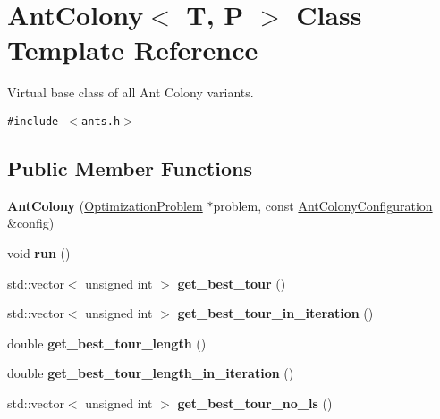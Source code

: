 \hypertarget{classAntColony}{
\section{AntColony$<$ T, P $>$ Class Template Reference}
\label{classAntColony}
}
Virtual base class of all Ant Colony variants.  


{\tt \#include $<$ants.h$>$}

\subsection*{Public Member Functions}
\begin{CompactItemize}
\item 
\hypertarget{classAntColony_68b01fbb4161e56af836d5d5fb99ea1e}{
\textbf{AntColony} (\hyperlink{classOptimizationProblem}{OptimizationProblem} $\ast$problem, const \hyperlink{classAntColonyConfiguration}{AntColonyConfiguration} \&config)}
\label{classAntColony_68b01fbb4161e56af836d5d5fb99ea1e}

\item 
\hypertarget{classAntColony_56f27f425a4f61a8c7f050dadf2e4bba}{
void \textbf{run} ()}
\label{classAntColony_56f27f425a4f61a8c7f050dadf2e4bba}

\item 
\hypertarget{classAntColony_904dbc6c22fcf7460f8cd6d27a692d31}{
std::vector$<$ unsigned int $>$ \textbf{get\_\-best\_\-tour} ()}
\label{classAntColony_904dbc6c22fcf7460f8cd6d27a692d31}

\item 
\hypertarget{classAntColony_a6acb9c16d45ee01fe4b800ab2706958}{
std::vector$<$ unsigned int $>$ \textbf{get\_\-best\_\-tour\_\-in\_\-iteration} ()}
\label{classAntColony_a6acb9c16d45ee01fe4b800ab2706958}

\item 
\hypertarget{classAntColony_99bedfbf44b8f43d062c90d5dfce6bcd}{
double \textbf{get\_\-best\_\-tour\_\-length} ()}
\label{classAntColony_99bedfbf44b8f43d062c90d5dfce6bcd}

\item 
\hypertarget{classAntColony_697a977e196575b4c840bddd1664a777}{
double \textbf{get\_\-best\_\-tour\_\-length\_\-in\_\-iteration} ()}
\label{classAntColony_697a977e196575b4c840bddd1664a777}

\item 
\hypertarget{classAntColony_88540742f97f22464682be15cf17f2d5}{
std::vector$<$ unsigned int $>$ \textbf{get\_\-best\_\-tour\_\-no\_\-ls} ()}
\label{classAntColony_88540742f97f22464682be15cf17f2d5}


\end{CompactItemize}
